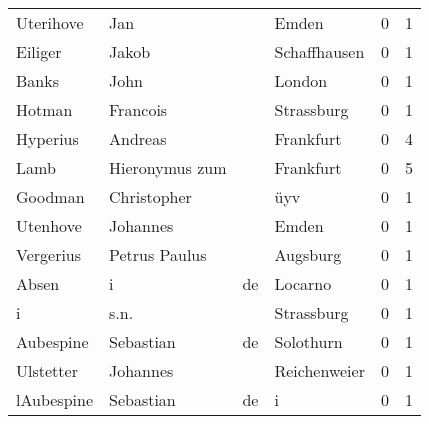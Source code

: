 \begin{center}
\begin{tiny}
\begin{longtabu}{llllrr}
                Uterihove &                                Jan &             &                                       Emden &          0 &         1 \\
                  Eiliger &                              Jakob &             &                                Schaffhausen &          0 &         1 \\
                    Banks &                               John &             &                                      London &          0 &         1 \\
                   Hotman &                           Francois &             &                                  Strassburg &          0 &         1 \\
                 Hyperius &                            Andreas &             &                                   Frankfurt &          0 &         4 \\
                     Lamb &                     Hieronymus zum &             &                                   Frankfurt &          0 &         5 \\
                  Goodman &                        Christopher &             &                                         üyv &          0 &         1 \\
                 Utenhove &                           Johannes &             &                                       Emden &          0 &         1 \\
                Vergerius &                      Petrus Paulus &             &                                    Augsburg &          0 &         1 \\
                    Absen &                                  i &          de &                                     Locarno &          0 &         1 \\
                        i &                               s.n. &             &                                  Strassburg &          0 &         1 \\
                Aubespine &                          Sebastian &          de &                                   Solothurn &          0 &         1 \\
                Ulstetter &                           Johannes &             &                                Reichenweier &          0 &         1 \\
               lAubespine &                          Sebastian &          de &                                           i &          0 &         1 \\

\end{longtabu}
\end{tiny}
\end{center}
